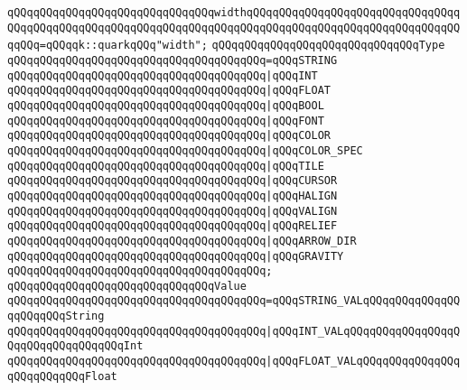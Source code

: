 \verb|qQQqqQQqqQQqqQQqqQQqqQQqqQQqqQQqwidthqQQqqQQqqQQqqQQqqQQqqQQqqQQqqQQqqQQqqQQqqQQqqQQqqQQqqQQqqQQqqQQqqQQqqQQqqQQqqQQqqQQqqQQqqQQqqQQqqQQqqQQqqQQq=qQQqqk::quarkqQQq"width";|\newline
\newline
\verb|qQQqqQQqqQQqqQQqqQQqqQQqqQQqqQQqType|\newline
\verb|qQQqqQQqqQQqqQQqqQQqqQQqqQQqqQQqqQQqqQQq=qQQqSTRING|\newline
\verb|qQQqqQQqqQQqqQQqqQQqqQQqqQQqqQQqqQQqqQQq|\verb#|qQQqINT#\newline
\verb|qQQqqQQqqQQqqQQqqQQqqQQqqQQqqQQqqQQqqQQq|\verb#|qQQqFLOAT#\newline
\verb|qQQqqQQqqQQqqQQqqQQqqQQqqQQqqQQqqQQqqQQq|\verb#|qQQqBOOL#\newline
\verb|qQQqqQQqqQQqqQQqqQQqqQQqqQQqqQQqqQQqqQQq|\verb#|qQQqFONT#\newline
\verb|qQQqqQQqqQQqqQQqqQQqqQQqqQQqqQQqqQQqqQQq|\verb#|qQQqCOLOR#\newline
\verb|qQQqqQQqqQQqqQQqqQQqqQQqqQQqqQQqqQQqqQQq|\verb#|qQQqCOLOR_SPEC#\newline
\verb|qQQqqQQqqQQqqQQqqQQqqQQqqQQqqQQqqQQqqQQq|\verb#|qQQqTILE#\newline
\verb|qQQqqQQqqQQqqQQqqQQqqQQqqQQqqQQqqQQqqQQq|\verb#|qQQqCURSOR#\newline
\verb|qQQqqQQqqQQqqQQqqQQqqQQqqQQqqQQqqQQqqQQq|\verb#|qQQqHALIGN#\newline
\verb|qQQqqQQqqQQqqQQqqQQqqQQqqQQqqQQqqQQqqQQq|\verb#|qQQqVALIGN#\newline
\verb|qQQqqQQqqQQqqQQqqQQqqQQqqQQqqQQqqQQqqQQq|\verb#|qQQqRELIEF#\newline
\verb|qQQqqQQqqQQqqQQqqQQqqQQqqQQqqQQqqQQqqQQq|\verb#|qQQqARROW_DIR#\newline
\verb|qQQqqQQqqQQqqQQqqQQqqQQqqQQqqQQqqQQqqQQq|\verb#|qQQqGRAVITY#\newline
\verb|qQQqqQQqqQQqqQQqqQQqqQQqqQQqqQQqqQQqqQQq;|\newline
\newline
\verb|qQQqqQQqqQQqqQQqqQQqqQQqqQQqqQQqValue|\newline
\verb|qQQqqQQqqQQqqQQqqQQqqQQqqQQqqQQqqQQqqQQq=qQQqSTRING_VALqQQqqQQqqQQqqQQqqQQqqQQqString|\newline
\verb|qQQqqQQqqQQqqQQqqQQqqQQqqQQqqQQqqQQqqQQq|\verb#|qQQqINT_VALqQQqqQQqqQQqqQQqqQQqqQQqqQQqqQQqqQQqInt#\newline
\verb|qQQqqQQqqQQqqQQqqQQqqQQqqQQqqQQqqQQqqQQq|\verb#|qQQqFLOAT_VALqQQqqQQqqQQqqQQqqQQqqQQqqQQqFloat#\newline
